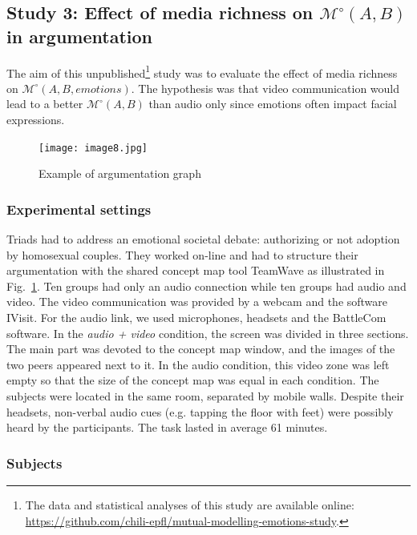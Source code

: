 \documentclass[natbib]{svjour3}
\newcommand{\eg}{e.g.\xspace}
\newcommand{\Model}[3]{{$\mathcal{M}^{\circ}(#1, #2, #3)$}}
\newcommand{\gModel}[2]{{$\mathcal{M}^{\circ}(#1, #2)$}}
\begin{document}
\subsection{{\bf Study 3}:  Effect of media richness on \gModel{A}{B} in argumentation}

The aim of this unpublished\footnote{The data and statistical analyses of this
study are available online:
\url{https://github.com/chili-epfl/mutual-modelling-emotions-study}.} study was
to evaluate the effect of media richness on \Model{A}{B}{emotions}.  The
hypothesis was that video communication would lead to a better \gModel{A}{B}
than audio only since emotions often impact facial expressions.

\begin{figure}[ht!]
        \centering
        \texttt{[image: image8.jpg]}
        \caption{Example of argumentation graph}
        \label{study3:argumentation_graph}
\end{figure}


\subsubsection*{Experimental settings} 

Triads had to address an emotional societal debate: authorizing or not adoption
by homosexual couples. They worked on-line and had to structure their
argumentation with the shared concept map tool {\sc TeamWave} as illustrated in
Fig.~\ref{study3:argumentation_graph}. Ten groups had only an audio connection
while ten groups had audio and video. The video communication was provided by a
webcam and the software {\sc IVisit}. For the audio link, we used microphones,
headsets and the {\sc BattleCom} software. In the \emph{audio + video}
condition, the screen was divided in three sections. The main part was devoted
to the concept map window, and the images of the two peers appeared next to it.
In the audio condition, this video zone was left empty so that the size of the
concept map was equal in each condition. The subjects were located in the same
room, separated by mobile walls. Despite their headsets, non-verbal audio cues
(\eg tapping the floor with feet) were possibly heard by the participants. The
task lasted in average 61 minutes.

\subsubsection*{Subjects}
\end{document}
